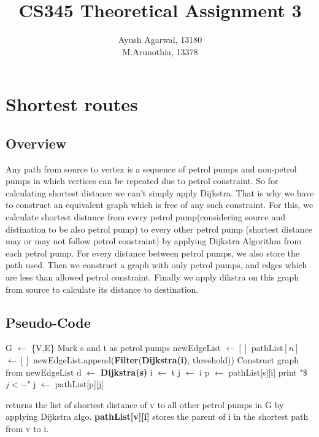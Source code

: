 \documentclass{article}
\title{CS345 Theoretical Assignment 3 \\ }
\author{\vspace{2mm} \large Ayush Agarwal, 13180 \\ M.Arunothia, 13378}
\date{}
\begin{document}
\maketitle
\tableofcontents
\newpage
\section{Shortest routes}
\subsection{Overview}
Any path from source to vertex is a sequence of petrol pumps and non-petrol pumps in which vertices can be repeated due to petrol constraint. So 
for calculating shortest distance we can't simply apply Dijkstra. That is why we have to construct an equivalent graph which is free of any such constraint.
For this, we calculate shortest distance from every petrol pump(considering source and distination to be also petrol pump) to every other petrol pump 
(shortest distance may or may not follow petrol constraint) by applying Dijkstra Algorithm from each petrol pump. 
For every distance between petrol pumps, we also store the path used. Then we construct a graph
with only petrol pumps, and edges which are less than allowed petrol constraint. Finally we apply dikstra on this graph from source to calculate
its distance to destination. 

\subsection{Pseudo-Code}
\begin{algorithmic}[1]
  \State G $\gets$ \{V,E\}
  \State Mark s and t as petrol pumps
  \State newEdgeList $\gets []$
  \State pathList$[n]$ $\gets []$
  \State newEdgeList.append(\textbf{Filter}(\textbf{Dijkstra(i)}, threshold))
  \EndFor
  \State Construct graph from newEdgeList
  \State d $\gets$ \textbf{Dijkstra(s)}
  \State i $\gets$ t
  \State j $\gets$ i
  \State p $\gets$ pathList[s][i]
  \State print "\$$j<-$"
  \State j $\gets$ pathList[p][j]
  \EndWhile
  \EndWhile
  \EndProcedure
\end{algorithmic} 

\vspace*{0.2cm}
\begin{algorithmic}[1]
    \State returns the list of shortest distance of v to all other petrol pumps in G by applying Dijkstra algo.
    \State \textbf{pathList[v][i]} stores the parent of i in the shortest path from v to i.
  \EndProcedure 
\end{algorithmic}
\end{document}
